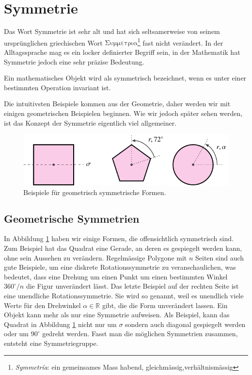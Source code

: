 \section{Symmetrie}
Das Wort Symmetrie ist sehr alt und hat sich seltsamerweise von seinem
ursprünglichen griechischen Wort \(\mathrm{\Sigma\upsilon\mu\mu\varepsilon\tau\rho\iota\alpha}\)\footnote{\emph{Symmetr\'ia}: ein gemeinsames Mass habend, gleichmässig,verhältnismässig} fast nicht verändert.
In der Alltagssprache mag es ein locker definierter Begriff sein, in der Mathematik hat Symmetrie jedoch eine sehr präzise Bedeutung.
\begin{definition}[Symmetrie]
  Ein mathematisches Objekt wird als symmetrisch bezeichnet, wenn es unter einer bestimmten Operation invariant ist.
\end{definition}
Die intuitivsten Beispiele kommen aus der Geometrie, daher werden wir mit einigen geometrischen Beispielen beginnen.
Wie wir jedoch später sehen werden, ist das Konzept der Symmetrie eigentlich viel allgemeiner.

\begin{figure}
  \centering
  \includegraphics{papers/punktgruppen/figures/symmetric-shapes}
  \caption{
    Beispiele für geometrisch symmetrische Formen.
    \label{fig:punktgruppen:geometry-example}
  }
\end{figure}

\subsection{Geometrische Symmetrien}

In Abbildung \ref{fig:punktgruppen:geometry-example} haben wir einige Formen, die offensichtlich symmetrisch sind.
Zum Beispiel hat das Quadrat eine Gerade, an deren es gespiegelt werden kann, ohne sein Aussehen zu verändern.
Regelmässige Polygone mit \(n\) Seiten sind auch gute Beispiele, um eine diskrete Rotationssymmetrie zu veranschaulichen, was bedeutet, dass eine Drehung um einen Punkt um einen bestimmten Winkel \(360^\circ/n\) die Figur unverändert lässt.
Das letzte Beispiel auf der rechten Seite ist eine unendliche Rotationssymmetrie. Sie wird so genannt, weil es unendlich viele Werte für den Drehwinkel \(\alpha \in \mathbb{R}\) gibt, die die Form unverändert lassen.
Ein Objekt kann mehr als nur eine Symmetrie aufweisen.
Als Beispiel, kann das Quadrat in Abbildung \ref{fig:punktgruppen:geometry-example} nicht nur um \(\sigma\) sondern auch diagonal gespiegelt werden oder um \(90^\circ\) gedreht werden.
Fasst man die möglichen Symmetrien zusammen, entsteht eine Symmetriegruppe.

